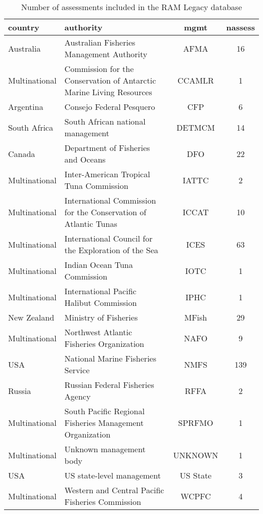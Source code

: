 \begin{table}[ht]
\begin{center}
\caption{Number of assessments included in the RAM Legacy database}
\label{tab:mgmt}
\begin{tabular}{p{3cm}p{5cm}cc}
  \hline
country & authority & mgmt & nassess \\ 
  \hline
Australia & Australian Fisheries Management Authority & AFMA &  16 \\ 
  Multinational & Commission for the Conservation of Antarctic Marine Living Resources & CCAMLR &   1 \\ 
  Argentina & Consejo Federal Pesquero & CFP &   6 \\ 
  South Africa & South African national management & DETMCM &  14 \\ 
  Canada & Department of Fisheries and Oceans & DFO &  22 \\ 
  Multinational & Inter-American Tropical Tuna Commission & IATTC &   2 \\ 
  Multinational & International Commission for the Conservation of Atlantic Tunas & ICCAT &  10 \\ 
  Multinational & International Council for the Exploration of the Sea & ICES &  63 \\ 
  Multinational & Indian Ocean Tuna Commission & IOTC &   1 \\ 
  Multinational & International Pacific Halibut Commission & IPHC &   1 \\ 
  New Zealand & Ministry of Fisheries & MFish &  29 \\ 
  Multinational & Northwest Atlantic Fisheries Organization & NAFO &   9 \\ 
  USA & National Marine Fisheries Service & NMFS & 139 \\ 
  Russia & Russian Federal Fisheries Agency & RFFA &   2 \\ 
  Multinational & South Pacific Regional Fisheries Management Organization & SPRFMO &   1 \\ 
  Multinational & Unknown management body & UNKNOWN &   1 \\ 
  USA & US state-level management & US State &   3 \\ 
  Multinational & Western and Central Pacific Fisheries Commission & WCPFC &   4 \\ 
   \hline
\end{tabular}
\end{center}
\end{table}
